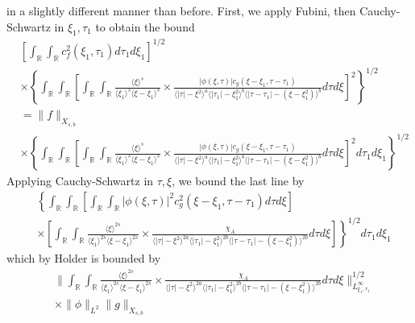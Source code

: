 \documentclass[12pt,reqno]{amsart}
\numberwithin{equation}{section}  %
\numberwithin{figure}{section}
\newcommand{\rr}{\mathbb{R}}
\theoremstyle{plain}
\theoremstyle{definition}
\theoremstyle{remark}
\begin{document}
in a slightly different manner than before. First, we apply 
Fubini, then Cauchy-Schwartz in $\xi_{1}, \tau_{1}$ to obtain the bound
%
%
\begin{equation*}
\begin{split}
  & \left[ \int_{\rr} \int_{\rr} c_{f}^{2}(\xi_{1}, \tau_{1}) d \tau_{1} d
  \xi_{1} \right]^{1/2}
  \\
  & \times \left \{ \int_{\rr} \int_{\rr}   
 \left[
  \int_{\rr} \int_{\rr}
   \frac{\langle \xi \rangle ^{s}}{\langle \xi_{1} \rangle ^{s} \langle
   \xi - \xi_{1}\rangle ^{s}} \times \frac{|\phi(\xi, \tau)| c_{g}(\xi -
   \xi_{1}, \tau - \tau_{1})
}{\langle | \tau | - \xi^{2} \rangle
  ^{a} \langle | \tau_{1} | - \xi_{1}^{2} \rangle ^{b} \langle | \tau -
  \tau_{1} | - (\xi - \xi_{1}^{2}) \rangle ^{b}} d \tau d \xi 
  \right]^{2} \right \}^{1/2}
  \\
  & = \| f \|_{X_{s,b}}
  \\
  & \times \left \{ \int_{\rr} \int_{\rr}   
 \left[
  \int_{\rr} \int_{\rr}
   \frac{\langle \xi \rangle ^{s}}{\langle \xi_{1} \rangle ^{s} \langle
   \xi - \xi_{1}\rangle ^{s}} \times \frac{|\phi(\xi, \tau)| c_{g}(\xi -
   \xi_{1}, \tau - \tau_{1})
}{\langle | \tau | - \xi^{2} \rangle
  ^{a} \langle | \tau_{1} | - \xi_{1}^{2} \rangle ^{b} \langle | \tau -
  \tau_{1} | - (\xi - \xi_{1}^{2}) \rangle ^{b}} d \tau d \xi 
  \right]^{2} d \tau_{1} d \xi_{1} \right \}^{1/2}
\end{split}
\end{equation*}
%
Applying Cauchy-Schwartz in $\tau, \xi$, we bound the last line by 
%
%
\begin{equation*}
\begin{split}
& \left \{ \int_{\rr} \int_{\rr}   
  \left [ \int_{\rr} \int_{\rr}
  | \phi(\xi, \tau)|^{2} c_{g}^{2}(\xi - \xi_{1}, \tau - \tau_{1}) d \tau d \xi 
    \right ] \right . 
   \\
   & \left. \times \left [ \int_{\rr} \int_{\rr} \frac{\langle \xi \rangle
   ^{2s}}{\langle \xi_{1} \rangle ^{2s} \langle \xi - \xi_{1}\rangle ^{2s}}
   \times \frac{\chi_{A}}{\langle | \tau | - \xi^{2} \rangle ^{2a} \langle | \tau_{1} |
   - \xi_{1}^{2} \rangle ^{2b} \langle | \tau - \tau_{1} | - (\xi - \xi_{1}^{2})
   \rangle ^{2b}} d \tau d \xi \right ] \right \}^{1/2}d \tau_{1} d \xi_{1}
\end{split}
\end{equation*}
%
%
which by Holder is bounded by 
%
%
%
\begin{equation}
  \label{integral-bound-2nd-form}
\begin{split}
  & \| \int_{\rr} \int_{\rr} \frac{\langle \xi \rangle ^{2s}}{\langle \xi_{1} \rangle ^{2s} \langle
  \xi - \xi_{1}\rangle ^{2s}}  \times \frac{\chi_{A}}{\langle | \tau | - \xi^{2} \rangle
  ^{2a} \langle | \tau_{1} | - \xi_{1}^{2} \rangle ^{2b} \langle | \tau -
  \tau_{1} | - (\xi - \xi_{1}^{2}) \rangle ^{2b}} d \tau d \xi
  \|_{L^{\infty}_{\xi_{1}, \tau_{1}}}^{1/2}
  \\
  & \times \|\phi\|_{L^{2}} \| g \|_{X_{s,b}}
\end{split}
\end{equation}
\end{document}
